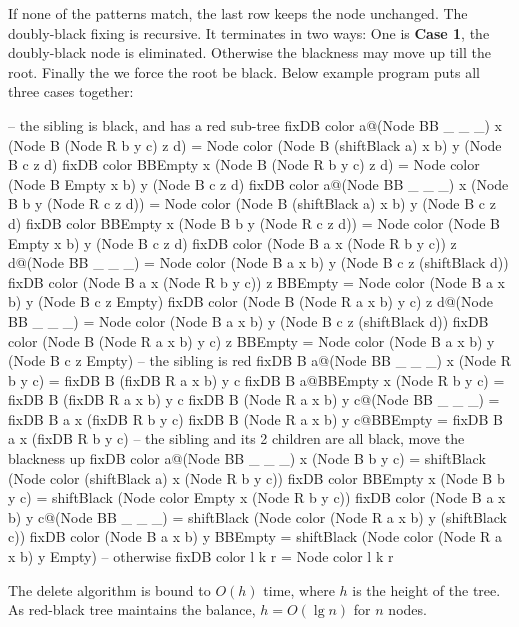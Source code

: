 \documentclass[b5paper]{article}
\begin{document}
If none of the patterns match, the last row keeps the node unchanged. The doubly-black fixing is recursive. It terminates in two ways: One is \textbf{Case 1}, the doubly-black node is eliminated. Otherwise the blackness may move up till the root. Finally the we force the root be black. Below example program puts all three cases together:

\begin{Haskell}
-- the sibling is black, and has a red sub-tree
fixDB color a@(Node BB _ _ _) x (Node B (Node R b y c) z d)
      = Node color (Node B (shiftBlack a) x b) y (Node B c z d)
fixDB color BBEmpty x (Node B (Node R b y c) z d)
      = Node color (Node B Empty x b) y (Node B c z d)
fixDB color a@(Node BB _ _ _) x (Node B b y (Node R c z d))
      = Node color (Node B (shiftBlack a) x b) y (Node B c z d)
fixDB color BBEmpty x (Node B b y (Node R c z d))
      = Node color (Node B Empty x b) y (Node B c z d)
fixDB color (Node B a x (Node R b y c)) z d@(Node BB _ _ _)
      = Node color (Node B a x b) y (Node B c z (shiftBlack d))
fixDB color (Node B a x (Node R b y c)) z BBEmpty
      = Node color (Node B a x b) y (Node B c z Empty)
fixDB color (Node B (Node R a x b) y c) z d@(Node BB _ _ _)
      = Node color (Node B a x b) y (Node B c z (shiftBlack d))
fixDB color (Node B (Node R a x b) y c) z BBEmpty
      = Node color (Node B a x b) y (Node B c z Empty)
-- the sibling is red
fixDB B a@(Node BB _ _ _) x (Node R b y c)
      = fixDB B (fixDB R a x b) y c
fixDB B a@BBEmpty x (Node R b y c)
      = fixDB B (fixDB R a x b) y c
fixDB B (Node R a x b) y c@(Node BB _ _ _)
      = fixDB B a x (fixDB R b y c)
fixDB B (Node R a x b) y c@BBEmpty
      = fixDB B a x (fixDB R b y c)
-- the sibling and its 2 children are all black, move the blackness up
fixDB color a@(Node BB _ _ _) x (Node B b y c)
      = shiftBlack (Node color (shiftBlack a) x (Node R b y c))
fixDB color BBEmpty x (Node B b y c)
      = shiftBlack (Node color Empty x (Node R b y c))
fixDB color (Node B a x b) y c@(Node BB _ _ _)
      = shiftBlack (Node color (Node R a x b) y (shiftBlack c))
fixDB color (Node B a x b) y BBEmpty
      = shiftBlack (Node color (Node R a x b) y Empty)
-- otherwise
fixDB color l k r = Node color l k r
\end{Haskell}

The delete algorithm is bound to $O(h)$ time, where $h$ is the height of the tree. As red-black tree maintains the balance, $h = O(\lg n)$ for $n$ nodes.

\begin{Exercise}
\end{Exercise}
\end{document}
